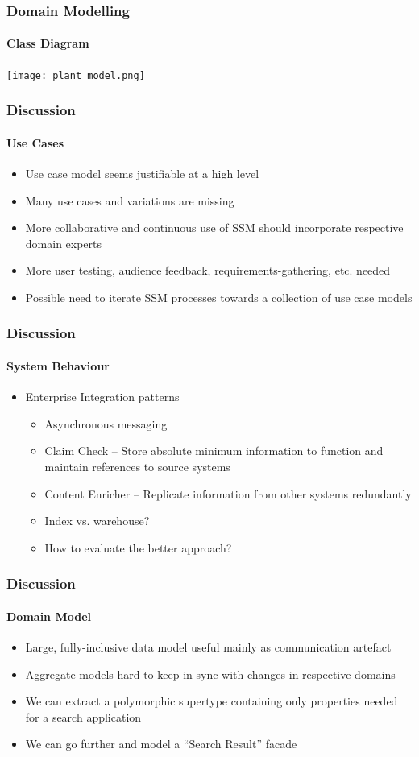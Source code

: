 \documentclass{beamer}
\begin{document}
\begin{frame}
  \frametitle{Domain Modelling}
  \framesubtitle{Class Diagram}
  \begin{center}
    \pause \texttt{[image: plant\_model.png]}
  \end{center}
\end{frame}


\begin{frame}
  \frametitle{Discussion}
  \framesubtitle{Use Cases}
  \begin{itemize}
    \pause \item Use case model seems justifiable at a high level
    \pause \item Many use cases and variations are missing
    \pause \item More collaborative and continuous use of SSM should incorporate respective domain experts
    \pause \item More user testing, audience feedback, requirements-gathering, etc. needed
    \pause \item Possible need to iterate SSM processes towards a collection of use case models
  \end{itemize}
\end{frame}

\begin{frame}
  \frametitle{Discussion}
  \framesubtitle{System Behaviour}
  \begin{itemize}
    \pause \item Enterprise Integration patterns
    \begin{itemize}
      \pause \item Asynchronous messaging
      \pause \item Claim Check -- Store absolute minimum information to function and maintain references to source systems
      \pause \item Content Enricher -- Replicate information from other systems redundantly
      \pause \item Index vs. warehouse?
      \pause \item How to evaluate the better approach?
    \end{itemize}
  \end{itemize}
\end{frame}

\begin{frame}
  \frametitle{Discussion}
  \framesubtitle{Domain Model}
  \begin{itemize}
    \pause \item Large, fully-inclusive data model useful mainly as communication artefact
    \pause \item Aggregate models hard to keep in sync with changes in respective domains
    \pause \item We can extract a polymorphic supertype containing only properties needed for a search application
    \pause \item We can go further and model a ``Search Result'' facade
  \end{itemize}
\end{frame}
\end{document}
